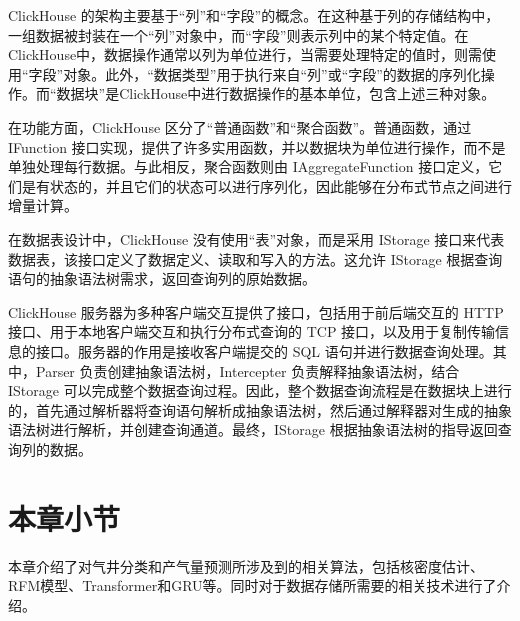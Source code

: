 ClickHouse 的架构主要基于“列”和“字段”的概念。在这种基于列的存储结构中，一组数据被封装在一个“列”对象中，而“字段”则表示列中的某个特定值。在ClickHouse中，数据操作通常以列为单位进行，当需要处理特定的值时，则需使用“字段”对象。此外，“数据类型”用于执行来自“列”或“字段”的数据的序列化操作。而“数据块”是ClickHouse中进行数据操作的基本单位，包含上述三种对象。

在功能方面，ClickHouse 区分了“普通函数”和“聚合函数”。普通函数，通过 IFunction 接口实现，提供了许多实用函数，并以数据块为单位进行操作，而不是单独处理每行数据。与此相反，聚合函数则由 IAggregateFunction 接口定义，它们是有状态的，并且它们的状态可以进行序列化，因此能够在分布式节点之间进行增量计算。

在数据表设计中，ClickHouse 没有使用“表”对象，而是采用 IStorage 接口来代表数据表，该接口定义了数据定义、读取和写入的方法。这允许 IStorage 根据查询语句的抽象语法树需求，返回查询列的原始数据。

ClickHouse 服务器为多种客户端交互提供了接口，包括用于前后端交互的 HTTP 接口、用于本地客户端交互和执行分布式查询的 TCP 接口，以及用于复制传输信息的接口。服务器的作用是接收客户端提交的 SQL 语句并进行数据查询处理。其中，Parser 负责创建抽象语法树，Intercepter 负责解释抽象语法树，结合 IStorage 可以完成整个数据查询过程。因此，整个数据查询流程是在数据块上进行的，首先通过解析器将查询语句解析成抽象语法树，然后通过解释器对生成的抽象语法树进行解析，并创建查询通道。最终，IStorage 根据抽象语法树的指导返回查询列的数据。

\section{本章小节}
本章介绍了对气井分类和产气量预测所涉及到的相关算法，包括核密度估计、RFM模型、Transformer和GRU等。同时对于数据存储所需要的相关技术进行了介绍。